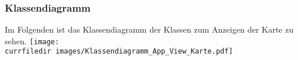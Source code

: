 \begin{samepage}
\subsubsection{Klassendiagramm}\label{App_Map_View_Klassendiagramm}
Im Folgenden ist das Klassendiagramm der Klassen zum Anzeigen der Karte zu sehen.
\texttt{[image: \\currfiledir images/Klassendiagramm\_App\_View\_Karte.pdf]}

\end{samepage}
